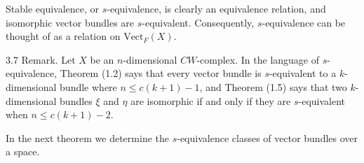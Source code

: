 Stable equivalence, or $s$-equivalence, is clearly an equivalence relation, and isomorphic vector bundles are $s$-equivalent. Consequently, $s$-equivalence can be thought of as a relation on $\text{Vect}_F(X)$.

3.7 Remark. Let $X$ be an $n$-dimensional $CW$-complex. In the language of $s$-equivalence, Theorem (1.2) says that every vector bundle is $s$-equivalent to a $k$-dimensional bundle where $n \leq c(k+1) - 1$, and Theorem (1.5) says that two $k$-dimensional bundles $\xi$ and $\eta$ are isomorphic if and only if they are $s$-equivalent when $n \leq c(k+1) - 2$.

In the next theorem we determine the $s$-equivalence classes of vector bundles over a space.
